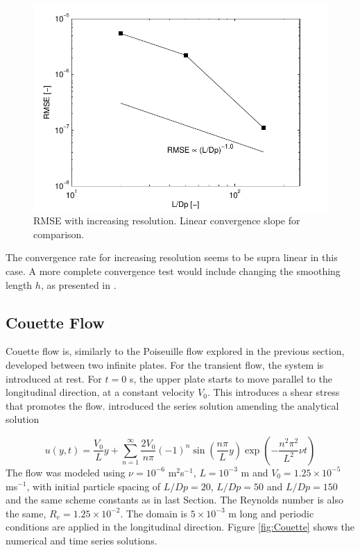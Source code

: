 %
\begin{figure}[ht!]
	\centering
	\includegraphics[width=0.70\linewidth]{Figures/5.Chapter/HP_RMSE}
	\caption{\ac{RMSE} with increasing resolution. Linear convergence slope for comparison.}
	\label{fig:HP_RMSE} 
\end{figure}
%
The convergence rate for increasing resolution seems to be supra linear in this case. A more complete convergence test would include changing the smoothing length $h$, as presented in \cite{Dehnen-2012}.

\subsection{Couette Flow}
\label{sec:validation_couette}

Couette flow is, similarly to the Poiseuille flow explored in the previous section, developed between two infinite plates. For the transient flow, the system is introduced at rest. For $t=0$ s, the upper plate starts to move parallel to the longitudinal direction, at a constant velocity $V_0$. This introduces a shear stress that promotes the flow. \cite{Drazin-2006} introduced the series solution amending the analytical solution

%
\begin{equation} \label{eq:Couette_t}
	u(y,t)=\frac{V_0}{L}y+\sum^\infty_{n=1}\frac{2V_0}{n\pi}(-1)^n\sin\left( \frac{n\pi}{L}y \right)\exp\left( -\frac{n^2\pi^2}{L^2}\nu t \right)
\end{equation}
%
The flow was modeled using $\nu=10^{-6}$ m$^2$s$^{-1}$, $L=10^{-3}$ m and $V_0=1.25\times10^{-5}$ ms$^{-1}$, with initial particle spacing of $L/Dp=20$, $L/Dp=50$ and $L/Dp=150$ and the same scheme constants as in last Section. The Reynolds number is also the same, $R_e=1.25\times10^{-2}$. The domain is $5\times10^{-3}$ m long and periodic conditions are applied in the longitudinal direction. Figure \ref{fig:Couette} shows the numerical and time series solutions.

